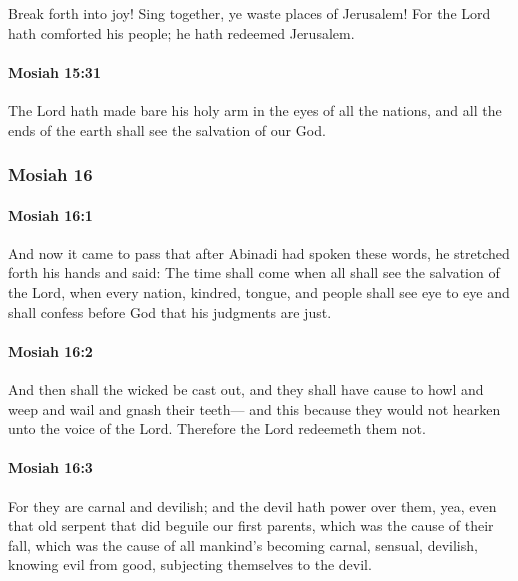 			Break forth into joy!
			Sing together, ye waste places of Jerusalem!
			For the Lord hath comforted his people;
			he hath redeemed Jerusalem.

		\paragraph{Mosiah 15:31} %
			\label{MOSIAH-15-31}

			The Lord hath made bare his holy arm in the eyes of all the nations,
			and all the ends of the earth shall see the salvation of our God.
			
	\subsubsection{Mosiah 16} %
		\label{MOSIAH-16}
		
		\paragraph{Mosiah 16:1} %
			\label{MOSIAH-16-1}

			And now it came to pass that after Abinadi had spoken these words,
			he stretched forth his hands and said:
			The time shall come when all shall see the salvation of the Lord,
			when every nation, kindred, tongue, and people shall see eye to eye
			and shall confess before God that his judgments are just.

		\paragraph{Mosiah 16:2} %
			\label{MOSIAH-16-2}

			And then shall the wicked be cast out,
			and they shall have cause to howl and weep and wail and gnash their teeth---
			and this because they would not hearken unto the voice of the Lord.
			Therefore the Lord redeemeth them not.

		\paragraph{Mosiah 16:3} %
			\label{MOSIAH-16-3}

			For they are carnal and devilish;
			and the devil hath power over them,
			yea, even that old serpent that did beguile our first parents,
			which was the cause of their fall,
			which was the cause of all mankind's becoming carnal, sensual, devilish,
			knowing evil from good,
			subjecting themselves to the devil.

